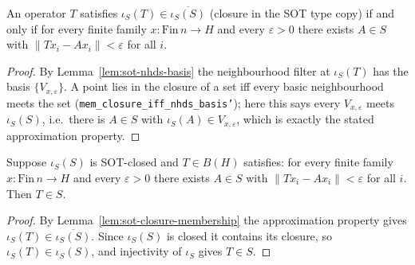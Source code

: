 \begin{lemma}
    \label{lem:sot-closure-membership}
    \leanok
    An operator $T$ satisfies $\iota_S(T) \in \overline{\iota_S(S)}$ (closure in
    the SOT type copy) if and only if for every finite family
    $x : \mathrm{Fin}\, n \to H$ and every $\varepsilon > 0$ there exists
    $A \in S$ with $\|T x_i - A x_i\| < \varepsilon$ for all $i$.
\end{lemma}
\begin{proof}
    By Lemma~\ref{lem:sot-nhds-basis} the neighbourhood filter at $\iota_S(T)$
    has the basis $\{V_{x, \varepsilon}\}$. A point lies in the closure of a set
    iff every basic neighbourhood meets the set
    (\texttt{mem\_closure\_iff\_nhds\_basis'}); here this says every
    $V_{x, \varepsilon}$ meets $\iota_S(S)$, i.e.\ there is $A \in S$ with
    $\iota_S(A) \in V_{x, \varepsilon}$, which is exactly the stated
    approximation property.
\end{proof}

\begin{lemma}
    \label{lem:sot-closed-mem}
    \leanok
    Suppose $\iota_S(S)$ is SOT-closed and $T \in B(H)$ satisfies: for every finite
    family $x : \mathrm{Fin}\, n \to H$ and every $\varepsilon > 0$ there exists
    $A \in S$ with $\|T x_i - A x_i\| < \varepsilon$ for all $i$. Then $T \in S$.
\end{lemma}
\begin{proof}
    By Lemma~\ref{lem:sot-closure-membership} the approximation property gives
    $\iota_S(T) \in \overline{\iota_S(S)}$. Since $\iota_S(S)$ is closed it contains
    its closure, so $\iota_S(T) \in \iota_S(S)$, and injectivity of $\iota_S$ gives
    $T \in S$.
\end{proof}

